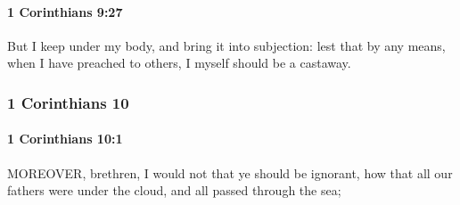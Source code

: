 		\paragraph{1 Corinthians 9:27} %
			\label{1CORINTHIANS-9-27}

			But I keep under my body, and bring it into subjection: lest that by any means, when I have preached to others, I myself should be a castaway.

			\begin{framed}
			\scriptsize
				\begin{compactdesc}
					\item[SBLG] 
				\end{compactdesc}
			\end{framed}

	\subsubsection{1 Corinthians 10} %
		\label{1CORINTHIANS-10}
		
		\paragraph{1 Corinthians 10:1} %
			\label{1CORINTHIANS-10-1}

			MOREOVER, brethren, I would not that ye should be ignorant, how that all our fathers were under the cloud, and all passed through the sea;

